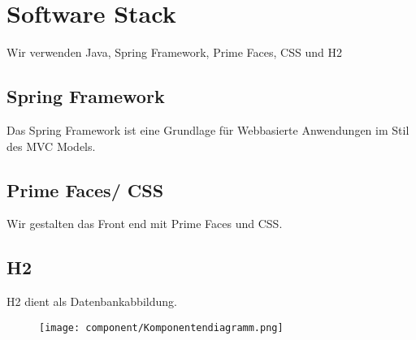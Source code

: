 \newpage
\section{Software Stack}
Wir verwenden Java, Spring Framework, Prime Faces, CSS und H2

\subsection{Spring Framework}
Das Spring Framework ist eine Grundlage für Webbasierte Anwendungen im Stil des MVC Models.

\subsection{Prime Faces/ CSS}
Wir gestalten das Front end mit Prime Faces und CSS.

\subsection{H2}
H2 dient als Datenbankabbildung.
\newpage
\begin{figure}
\texttt{[image: component/Komponentendiagramm.png]}
\end{figure}
